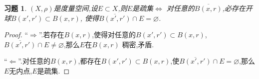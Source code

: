 \documentclass[a4paper,oneside,12pt]{ctexart}
\theoremstyle{plain}
\newtheorem{exercise}{习题}
\theoremstyle{nonumberplain}
\theoremstyle{nonumberplain}
\newtheorem{proof}{证明.}
\renewcommand{\emptyset}{\varnothing}
\begin{document}
\begin{exercise}
    \label{ex:7}
    $(X,\rho)$是度量空间,设$E\subset X$,则$E$是疏集$\Leftrightarrow$ 对任意的$\overline{B(x,r)}$,必存在开球$B(x',r')\subset B(x,r)$,
    使得$\overline{B(x',r')}\cap E=\emptyset$.
\end{exercise}

\begin{proof}
    ``$\Rightarrow$''.若存在$B(x,r)$,使得对任意的$B(x',r')\subset B(x,r)$,$\overline{B(x',r')}\cap E\neq \emptyset$,那么$E$在$B(x,r)$
    稠密,矛盾.

    ``$\Leftarrow$''.对任意的$B(x,r)$,都存在$B(x',r')\subset B(x,r)$,使$\overline{B(x',r')}\cap E=\emptyset$,那么$E$无内点,$E$是疏集.
\end{proof}
\end{document}
